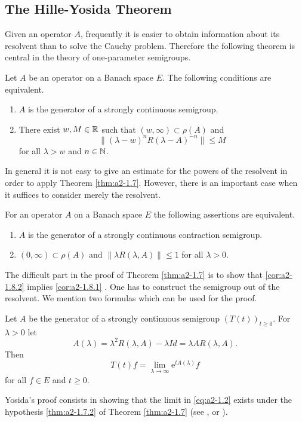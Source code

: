 \subsection{The Hille-Yosida Theorem} \label{subsec:a2-1.se3}
Given an operator $A$, frequently it is easier to obtain information about its resolvent than to solve the Cauchy problem.
Therefore the following theorem is central in the theory of one-parameter semigroups.
\begin{theorem}\label{thm:a2-1.7}
Let $A$ be an operator on a Banach space $E$.
The following conditions are equivalent.
\begin{enumerate}[\upshape (a)]
\item \label{thm:a2-1.7.1}
$A$ is the generator of a strongly continuous semigroup.
\item \label{thm:a2-1.7.2}
There exist $w, M \in \mathbb{R}$ such that $(w,\infty) \subset \rho(A)$ and
\[
    \| {(\lambda - w)^{n}} R(\lambda-A)^{-n}\| \leq M 
\]
for all $\lambda > w$ and $n \in \mathbb{N}$.
\end{enumerate}
\end{theorem}
In general it is not easy to give an estimate for the powers of the resolvent in order to apply Theorem \ref{thm:a2-1.7}. 
However, there is an important case when it suffices to consider merely the resolvent.
\begin{corollary}\label{cor:a2-1.8}
For an operator $A$ on a Banach space $E$ the following assertions are equivalent.
\begin{enumerate}[\upshape (a)]
\item \label{cor:a2-1.8.1}
$A$ is the generator of a strongly continuous contraction semigroup.
\item \label{cor:a2-1.8.2}
$(0,\infty) \subset \rho(A)$ and $\|\lambda R(\lambda,A)\| \leq 1$ for all $\lambda > 0$.
\end{enumerate}
\end{corollary}
The difficult part in the proof of Theorem \ref{thm:a2-1.7}   is to show that \ref{cor:a2-1.8.2}   implies \ref{cor:a2-1.8.1}  . 
One has to construct the semigroup out of the resolvent.
We mention two formulas which can be used for the proof.
\begin{proposition}\label{prop:a2-1.9}
Let $A$ be the generator of a strongly continuous semigroup
$(T(t))_{t \geq 0}$.
For $\lambda > 0$ let 
\[
A(\lambda) = \lambda^{2} R(\lambda,A)-\lambda Id  =\lambda A R(\lambda,A).
\]
Then
\begin{equation}\label{eq:a2-1.2}
    T(t)f = \lim_{\lambda \to \infty} \mathrm{e}^{tA(\lambda)}f
\end{equation}
for all $f \in E$ and $t \geq 0$.
\end{proposition}
Yosida's proof consists in showing that the limit in \eqref{eq:a2-1.2} exists under the hypothesis  \ref{thm:a2-1.7.2} of Theorem  \ref{thm:a2-1.7}  
(see \citet{davies:1980}, \citet{goldstein:1985b} or \citet{pazy:1983}).

